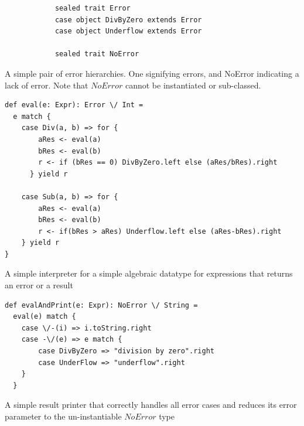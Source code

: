 \documentclass[12pt,a4paper,twoside,openright]{report}
\renewcommand{\baselinestretch}{1.1}    %
\begin{document}
\renewcommand{\baselinestretch}{0.8}
\begin{framed}
	\begin{framed}
		\begin{verbatim}
			sealed trait Error
			case object DivByZero extends Error
			case object Underflow extends Error

			sealed trait NoError
		\end{verbatim}
	\end{framed}
	
	A simple pair of error hierarchies. One signifying errors, and NoError indicating a lack of error. Note that $NoError$ cannot be instantiated or sub-classed.


	\begin{framed}
		\begin{verbatim}
def eval(e: Expr): Error \/ Int = 
  e match {
    case Div(a, b) => for {
        aRes <- eval(a)
        bRes <- eval(b)
        r <- if (bRes == 0) DivByZero.left else (aRes/bRes).right
      } yield r

    case Sub(a, b) => for {
        aRes <- eval(a)
        bRes <- eval(b)
        r <- if(bRes > aRes) Underflow.left else (aRes-bRes).right
    } yield r
}
		\end{verbatim}
	\end{framed}
\renewcommand{\baselinestretch}{1.1}
	
	A simple interpreter for a simple algebraic datatype for expressions that returns an error or a result
	
\renewcommand{\baselinestretch}{0.8}
	\begin{framed}
		\begin{verbatim}
def evalAndPrint(e: Expr): NoError \/ String = 
  eval(e) match {
    case \/-(i) => i.toString.right
    case -\/(e) => e match {
        case DivByZero => "division by zero".right
        case UnderFlow => "underflow".right
    }
  }
		\end{verbatim}
	\end{framed}
\renewcommand{\baselinestretch}{1.1}

	A simple result printer that correctly handles all error cases and reduces its error parameter to the un-instantiable $NoError$ type
		
\end{framed}
\end{document}
